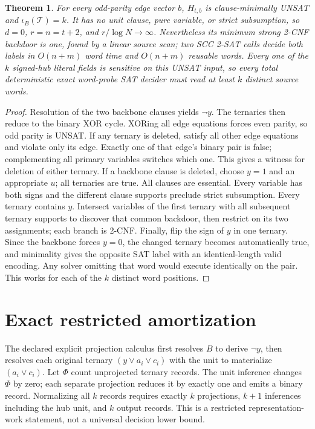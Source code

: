 \documentclass{article}
\newtheorem{theorem}{Theorem}
\begin{document}
\begin{theorem}
For every odd-parity edge vector $b$, $H_{t,b}$ is clause-minimally
UNSAT and $\iota_B(\mathcal T)=k$. It has no unit clause, pure variable,
or strict subsumption, so $d=0$, $r=n=t+2$, and
$r/\log N\to\infty$. Nevertheless its minimum strong 2-CNF backdoor
is one, found by a linear source scan; two SCC 2-SAT calls decide
both labels in $O(n+m)$ word time and $O(n+m)$ reusable words.
Every one of the $k$ signed-hub literal fields is sensitive on this
UNSAT input, so every total deterministic exact word-probe SAT
decider must read at least $k$ distinct source words.
\end{theorem}
\begin{proof}
Resolution of the two backbone clauses yields $\neg y$.
The ternaries then reduce to the binary XOR cycle. XORing all
edge equations forces even parity, so odd parity is UNSAT.
If any ternary is deleted, satisfy all other edge equations and violate
only its edge. Exactly one of that edge's binary pair is false;
complementing all primary variables switches which one. This gives a
witness for deletion of either ternary. If a backbone clause is
deleted, choose $y=1$ and an appropriate $u$; all ternaries are true.
All clauses are essential. Every variable has both signs and the
different clause supports preclude strict subsumption.
Every ternary contains $y$. Intersect variables of the first ternary
with all subsequent ternary supports to discover that common
backdoor, then restrict on its two assignments; each branch is 2-CNF.
Finally, flip the sign of $y$ in one ternary. Since the backbone forces
$y=0$, the changed ternary becomes automatically true, and minimality
gives the opposite SAT label with an identical-length valid encoding.
Any solver omitting that word would execute identically on the pair.
This works for each of the $k$ distinct word positions.
\end{proof}

\section*{Exact restricted amortization}
The declared explicit projection calculus first resolves $B$ to
derive $\neg y$, then resolves each original ternary
$(y\vee a_i\vee c_i)$ with the unit to materialize
$(a_i\vee c_i)$. Let $\Phi$ count unprojected ternary records.
The unit inference changes $\Phi$ by zero; each separate projection
reduces it by exactly one and emits a binary record. Normalizing all
$k$ records requires exactly $k$ projections, $k+1$ inferences
including the hub unit, and $k$ output records. This is a restricted
representation-work statement, not a universal decision lower bound.
\end{document}
